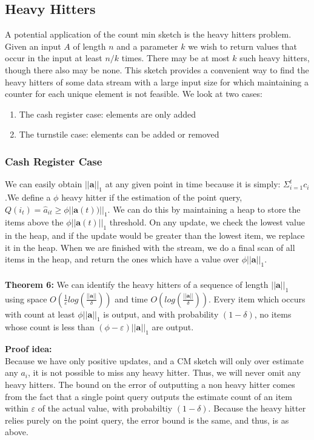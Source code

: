 \documentclass[11pt]{article}
\begin{document}
{\subsection{Heavy Hitters}
A potential application of the count min sketch is the heavy hitters problem. Given an input $A$ of length $n$ and a parameter $k$ we wish to return values that occur in the input at least $n/k$ times. There may be at most $k$ such heavy hitters, though there also may be none. This sketch provides a convenient way to find the heavy hitters of some data stream with a large input size for which  maintaining a counter for each unique element is not feasible. We look at two cases:
\begin{enumerate}
\item The cash register case: elements are only added
\item The turnstile case: elements can be added or removed
\end{enumerate}

\subsubsection{Cash Register Case}
We can easily obtain $||\bm{a}||_1$ at any given point in time because it is simply: $\Sigma_{i=1}^t c_i$.We define a $\phi$ heavy hitter if the estimation of the point query, $Q(i_t) =  \hat a_{it} \geq \phi ||\bm{a}(t))||_1$. We can do this by maintaining a heap to store the items above the $\phi||\bm{a}(t)||_1$ threshold. On any update, we check the lowest value in the heap, and if the update would be greater than the lowest item, we replace it in the heap. When we are finished with the stream, we do a final scan of all items in the heap, and return the ones which have a value over $\phi||\bm{a}||_1$.\\\\
\textbf{Theorem 6: } We can identify the heavy hitters of a sequence of length $||\bm{a}||_1$ using space $O(\frac{1}{\varepsilon}log(\frac{||\bm{a}||}{\delta}))$ and time $O(log(\frac{||\bm{a}||}{\delta}))$. Every item which occurs with count at least
$\phi ||\bm{a}||_1$ is output, and with probability $(1-\delta)$, no items whose count is less than $(\phi - \varepsilon)||\bm{a}||_1$ are output.

\textbf{Proof idea:}\\
Because we have only positive updates, and a CM sketch will only over estimate any $a_i$,
it is not possible to miss any heavy hitter. Thus, we will never omit any heavy
hitters. The bound on the error of outputting a non heavy hitter comes from the
fact that a single point query outputs the estimate count of an item within
$\varepsilon$ of the actual value, with probabiltiy $(1-\delta)$. Because the heavy
hitter relies purely on the point query, the error bound is the same, and thus,
is as above.
}
\end{document}
